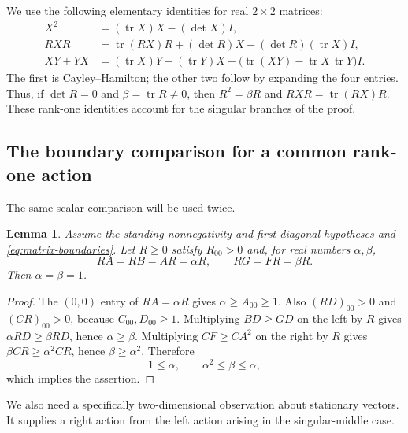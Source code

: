 \documentclass[11pt,a4paper]{article}
\newtheorem{lemma}[theorem]{Lemma}
\newcommand{\tr}{\operatorname{tr}}
\begin{document}
We use the following elementary identities for real $2\times2$
matrices:
\begin{align}
X^2&=(\tr X)X-(\det X)I,\label{eq:matrix-ch}\\
RXR&=\tr(RX)R+(\det R)X-(\det R)(\tr X)I,
  \label{eq:matrix-sandwich}\\
XY+YX&=(\tr X)Y+(\tr Y)X+
 \bigl(\tr(XY)-\tr X\,\tr Y\bigr)I.
  \label{eq:matrix-polarized}
\end{align}
The first is Cayley--Hamilton; the other two follow by expanding the
four entries. Thus, if $\det R=0$ and $\beta=\tr R\ne0$, then
$R^2=\beta R$ and $RXR=\tr(RX)R$. These rank-one identities account for
the singular branches of the proof.

\subsection{The boundary comparison for a common rank-one action}
The same scalar comparison will be used twice.

\begin{lemma}\label{lem:matrix-rankone-boundary}
Assume the standing nonnegativity and first-diagonal hypotheses and
\eqref{eq:matrix-boundaries}. Let $R\ge0$ satisfy $R_{00}>0$ and, for
real numbers $\alpha,\beta$,
\[
RA=RB=AR=\alpha R,\qquad RG=FR=\beta R.
\]
Then $\alpha=\beta=1$.
\end{lemma}
\begin{proof}
The $(0,0)$ entry of $RA=\alpha R$ gives $\alpha\ge A_{00}\ge1$.
Also $(RD)_{00}>0$ and $(CR)_{00}>0$, because $C_{00},D_{00}\ge1$.
Multiplying $BD\ge GD$ on the left by $R$ gives
$\alpha RD\ge\beta RD$, hence $\alpha\ge\beta$. Multiplying
$CF\ge CA^2$ on the right by $R$ gives
$\beta CR\ge\alpha^2 CR$, hence $\beta\ge\alpha^2$. Therefore
\[
1\le\alpha,\qquad \alpha^2\le\beta\le\alpha,
\]
which implies the assertion.
\end{proof}

We also need a specifically two-dimensional observation about stationary
vectors. It supplies a right action from the left action arising in the
singular-middle case.
\end{document}
